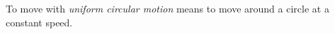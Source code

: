 \documentclass{ximera}
\begin{document}
\begin{exploration}

To move with \emph{uniform circular motion} means to move around a circle at a constant speed.

 
\begin{onlineOnly}
    \begin{center}
\end{center}
\end{onlineOnly}
\end{exploration}
\end{document}
